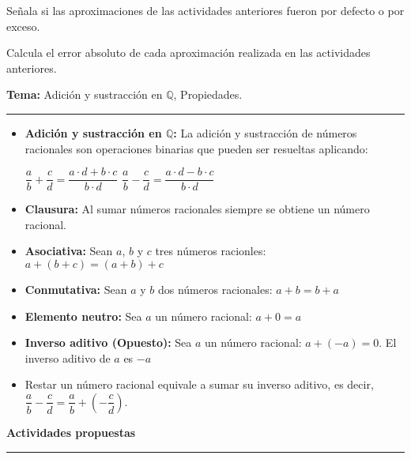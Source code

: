 \documentclass[spanish,letterpaper, 11pt, addpoints, answers]{exam}
\begin{document}
\begin{questions}
  \question Señala si las aproximaciones de las actividades anteriores fueron por defecto o por exceso.

  \question Calcula el error absoluto de cada aproximación realizada en las actividades anteriores.

  \newpage

  \parbox{6in}{
    \textbf{Tema:} Adición y sustracción en $\mathbb{Q}$, Propiedades.}
  \vspace{0.15in}
  \hrule

  \begin{itemize}
    \item \textbf{Adición y sustracción en $\mathbb{Q}$:} La adición y sustracción de números racionales son operaciones binarias que pueden ser resueltas aplicando:
          \begin{center}
            $\dfrac{a}{b}+\dfrac{c}{d}=\dfrac{a\cdot d+b\cdot c}{b\cdot d}$\hspace{1cm} $\dfrac{a}{b}-\dfrac{c}{d}=\dfrac{a\cdot d-b\cdot c}{b\cdot d}$
          \end{center}

    \item \textbf{Clausura:} Al sumar números racionales siempre se obtiene un número racional.
    \item \textbf{Asociativa:} Sean $a$, $b$ y $c$ tres números racionles: $a+(b+c)=(a+b)+c$
    \item \textbf{Conmutativa:} Sean $a$ y $b$ dos números racionales: $a+b=b+a$
    \item \textbf{Elemento neutro:} Sea $a$ un número racional: $a+0=a$
    \item \textbf{Inverso aditivo (Opuesto):} Sea $a$ un número racional: $a+(-a)=0$. El inverso aditivo de $a$ es $-a$
    \item Restar un número racional equivale a sumar su inverso aditivo, es decir, $\dfrac{a}{b}-\dfrac{c}{d}=\dfrac{a}{b}+\left(-\dfrac{c}{d}\right)$.
  \end{itemize}

  \parbox{6in}{
    \textbf{Actividades propuestas}}
  \vspace{0.15in}
  \hrule



\end{questions}
\end{document}
